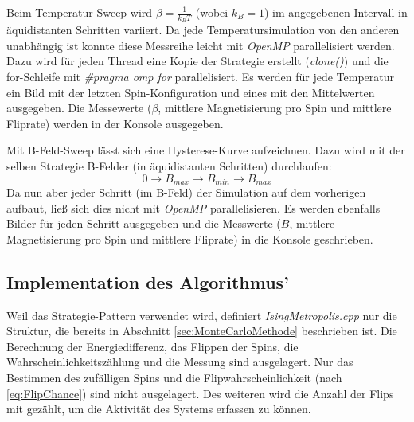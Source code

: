 Beim Temperatur-Sweep wird $\beta = \frac{1}{k_B T}$ (wobei $k_B = 1$) im angegebenen Intervall in äquidistanten Schritten variiert. Da jede Temperatursimulation von den anderen unabhängig ist konnte diese Messreihe leicht mit \textit{OpenMP} parallelisiert werden. Dazu wird für jeden Thread eine Kopie der Strategie erstellt (\textit{clone()}) und die for-Schleife mit \textit{\#pragma omp for} parallelisiert. Es werden für jede Temperatur ein Bild mit der letzten Spin-Konfiguration und eines mit den Mittelwerten ausgegeben. Die Messewerte ($\beta$, mittlere Magnetisierung pro Spin und mittlere Fliprate) werden in der Konsole ausgegeben.

Mit B-Feld-Sweep lässt sich eine Hysterese-Kurve aufzeichnen. Dazu wird mit der selben Strategie B-Felder (in äquidistanten Schritten) durchlaufen: \begin{equation} 0 \to B_{max} \to B_{min} \to B_{max} \nonumber \end{equation}
Da nun aber jeder Schritt (im B-Feld) der Simulation auf dem vorherigen aufbaut, ließ sich dies nicht mit \textit{OpenMP}  parallelisieren. 
Es werden ebenfalls Bilder für jeden Schritt ausgegeben und die Messwerte ($B$, mittlere Magnetisierung pro Spin und mittlere Fliprate) in die Konsole geschrieben.

\subsection{Implementation des Algorithmus'}
Weil das Strategie-Pattern verwendet wird, definiert \textit{IsingMetropolis.cpp} nur die Struktur, die bereits in Abschnitt \ref{sec:MonteCarloMethode} beschrieben ist. Die Berechnung der Energiedifferenz, das Flippen der Spins, die Wahrscheinlichkeitszählung und die Messung sind ausgelagert.  Nur das Bestimmen des zufälligen Spins und die Flipwahrscheinlichkeit
(nach \eqref{eq:FlipChance}) sind nicht ausgelagert. Des weiteren wird die Anzahl der Flips mit gezählt, um die Aktivität des Systems erfassen zu können. 


